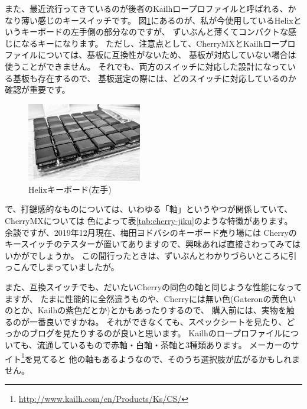 \documentclass[mingoth,a4paper]{jsarticle}
\begin{document}
また、最近流行ってきているのが後者のKailhロープロファイルと呼ばれる、かなり薄い感じのキースイッチです。
図\ref{fig:helix-katsu}にあるのが、私が今使用しているHelixというキーボードの左手側の部分なのですが、
ずいぶんと薄くてコンパクトな感じになるキーになります。
ただし、注意点として、CherryMXとKailhロープロファイルについては、基板に互換性がないため、
基板が対応していない場合は使うことができません。
それでも、両方のスイッチに対応した設計になっている基板も存在するので、
基板選定の際には、どのスイッチに対応しているのか確認が重要です。

\begin{figure}[htbp]
 \begin{center}
  \includegraphics[keepaspectratio,width=5cm]{./image201911-kansai-02/helix.jpg}
 \end{center}
 \vspace*{-1zw}
 \caption{Helixキーボード(左手)}
 \label{fig:helix-katsu}
\end{figure}

で、打鍵感的なものについては、いわゆる「軸」というやつが関係していて、
CherryMXについては
色によって表\ref{tab:cherry-jiku}のような特徴があります。
余談ですが、2019年12月現在、梅田ヨドバシのキーボード売り場には
Cherryのキースイッチのテスターが置いてありますので、興味あれば直接さわってみてはいかがでしょうか。
この間行ったときは、ずいぶんとわかりづらいところに引っこんでしまっていましたが。

また、互換スイッチでも、だいたいCherryの同色の軸と同じような性能になってますが、
たまに性能的に全然違うものや、Cherryには無い色(Gateronの黄色いのとか、Kailhの紫色だとか)とかもあったりするので、
購入前には、実物を触るのが一番良いですかね。
それができなくても、スペックシートを見たり、どっかのブログを見たりするのが良いと思います。
Kailhのロープロファイルについても、流通しているもので赤軸・白軸・茶軸と3種類あります。
メーカーのサイト\footnote{\url{http://www.kailh.com/en/Products/Ks/CS/}}を見てると
他の軸もあるようなので、そのうち選択肢が広がるかもしれません。
\end{document}
